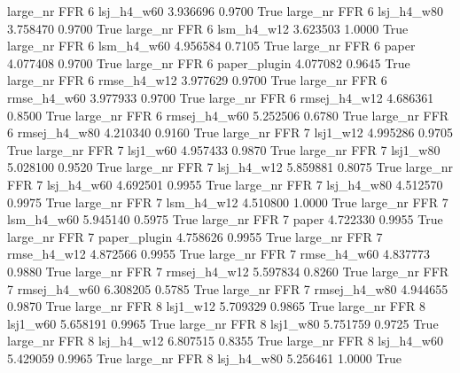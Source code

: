   large_nr      FFR                 6   lsj_h4_w60    3.936696      0.9700    True
  large_nr      FFR                 6   lsj_h4_w80    3.758470      0.9700    True
  large_nr      FFR                 6   lsm_h4_w12    3.623503      1.0000    True
  large_nr      FFR                 6   lsm_h4_w60    4.956584      0.7105    True
  large_nr      FFR                 6        paper    4.077408      0.9700    True
  large_nr      FFR                 6 paper_plugin    4.077082      0.9645    True
  large_nr      FFR                 6  rmse_h4_w12    3.977629      0.9700    True
  large_nr      FFR                 6  rmse_h4_w60    3.977933      0.9700    True
  large_nr      FFR                 6 rmsej_h4_w12    4.686361      0.8500    True
  large_nr      FFR                 6 rmsej_h4_w60    5.252506      0.6780    True
  large_nr      FFR                 6 rmsej_h4_w80    4.210340      0.9160    True
  large_nr      FFR                 7     lsj1_w12    4.995286      0.9705    True
  large_nr      FFR                 7     lsj1_w60    4.957433      0.9870    True
  large_nr      FFR                 7     lsj1_w80    5.028100      0.9520    True
  large_nr      FFR                 7   lsj_h4_w12    5.859881      0.8075    True
  large_nr      FFR                 7   lsj_h4_w60    4.692501      0.9955    True
  large_nr      FFR                 7   lsj_h4_w80    4.512570      0.9975    True
  large_nr      FFR                 7   lsm_h4_w12    4.510800      1.0000    True
  large_nr      FFR                 7   lsm_h4_w60    5.945140      0.5975    True
  large_nr      FFR                 7        paper    4.722330      0.9955    True
  large_nr      FFR                 7 paper_plugin    4.758626      0.9955    True
  large_nr      FFR                 7  rmse_h4_w12    4.872566      0.9955    True
  large_nr      FFR                 7  rmse_h4_w60    4.837773      0.9880    True
  large_nr      FFR                 7 rmsej_h4_w12    5.597834      0.8260    True
  large_nr      FFR                 7 rmsej_h4_w60    6.308205      0.5785    True
  large_nr      FFR                 7 rmsej_h4_w80    4.944655      0.9870    True
  large_nr      FFR                 8     lsj1_w12    5.709329      0.9865    True
  large_nr      FFR                 8     lsj1_w60    5.658191      0.9965    True
  large_nr      FFR                 8     lsj1_w80    5.751759      0.9725    True
  large_nr      FFR                 8   lsj_h4_w12    6.807515      0.8355    True
  large_nr      FFR                 8   lsj_h4_w60    5.429059      0.9965    True
  large_nr      FFR                 8   lsj_h4_w80    5.256461      1.0000    True
